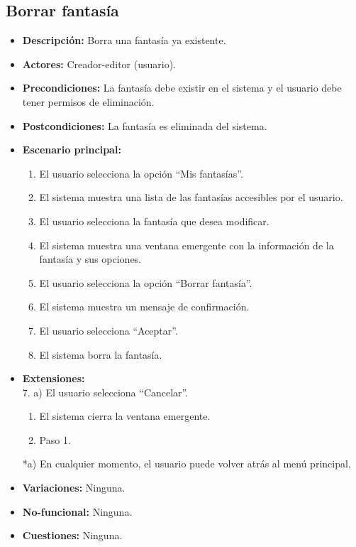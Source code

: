 \subsection{Borrar fantasía}
\begin{itemize}
	\item \textbf{Descripción:} Borra una fantasía ya existente.
	\item \textbf{Actores:} Creador-editor (usuario).
	\item \textbf{Precondiciones:} La fantasía debe existir en el sistema y el usuario debe tener permisos de eliminación.
	\item \textbf{Postcondiciones:} La fantasía es eliminada del sistema.
	\item \textbf{Escenario principal:}
	\begin{enumerate}
		\item El usuario selecciona la opción ``Mis fantasías''.
		\item El sistema muestra una lista de las fantasías accesibles por el usuario.
		\item El usuario selecciona la fantasía que desea modificar.
		\item El sistema muestra una ventana emergente con la información de la fantasía y sus opciones.
		\item El usuario selecciona la opción ``Borrar fantasía''.
		\item El sistema muestra un mensaje de confirmación.
		\item El usuario selecciona ``Aceptar''.
		\item El sistema borra la fantasía.
	\end{enumerate}
	\item \textbf{Extensiones:}  \\7. a) El usuario selecciona ``Cancelar''.
	\begin{enumerate}
		\item El sistema cierra la ventana emergente.
		\item Paso 1.
	\end{enumerate}
	*a) En cualquier momento, el usuario puede volver atrás al menú principal.
	\item \textbf{Variaciones:} Ninguna.
	\item \textbf{No-funcional:} Ninguna.
	\item \textbf{Cuestiones:} Ninguna.
\end{itemize}


